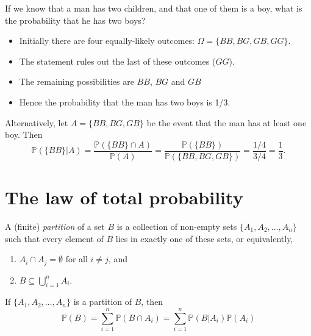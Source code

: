 \documentclass[lecture]{csm}
\newcommand{\prob}{\mathbb{P}}
\def\it{\item}
\def\bit{\begin{itemize}}
\def\eit{\end{itemize}}
\def\ben{\begin{enumerate}}
\def\een{\end{enumerate}}
\begin{document}
\newpage %

\begin{example}
If we know that a man has two children, and that one of them is a boy, what is the probability that he has two boys?
\begin{solution}
\bit
\it Initially there are four equally-likely outcomes: $\Omega=\{BB, BG, GB, GG\}$.
\it The statement rules out the last of these outcomes ($GG$).
\it The remaining possibilities are $BB$, $BG$ and $GB$
\it Hence the probability that the man has two boys is 1/3. 
\eit
Alternatively, let $A=\{BB, BG, GB\}$ be the event that the man has at least one boy. Then
\[
\prob(\{BB\}|A) = \frac{\prob(\{BB\}\cap A)}{\prob(A)} = \frac{\prob(\{BB\})}{\prob(\{BB,BG,GB\})} = \frac{1/4}{3/4} = \frac{1}{3}.
\]
\end{solution}
\end{example}


\section{The law of total probability}

\begin{definition}
A (finite) \emph{partition} of a set $B$ is a collection of non-empty sets $\{A_1,A_2,\ldots,A_n\}$ such that every element of $B$ lies in exactly one of these sets, or equivalently,
\ben
\it $A_i\cap A_j = \emptyset$ for all $i\neq j$, and 
\it $B\subseteq\bigcup_{i=1}^n A_i$.
\een
\end{definition}



\begin{theorem}\label{thm:law_of_total_probability}
If $\{A_1,A_2,\ldots,A_n\}$ is a partition of $B$, then
\[
\prob(B) = \sum_{i=1}^n \prob(B\cap A_i) = \sum_{i=1}^n \prob(B|A_i)\prob(A_i)
\]
\end{theorem}
\end{document}
